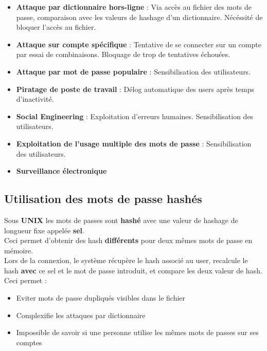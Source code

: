 \documentclass{report}
\begin{document}
		\begin{itemize}
			\item \textbf{Attaque par dictionnaire hors-ligne} : Via accès au fichier des mots de passe, comparaison avec les valeurs de hashage d'un dictionnaire. Nécéssité de bloquer l'accès au fichier.
			\item \textbf{Attaque sur compte spécifique} : Tentative de se connecter sur un compte par essai de combinaisons. Bloquage de trop de tentatives échouées.
			\item \textbf{Attaque par mot de passe populaire} : Sensibilisation des utilisateurs.
			\item \textbf{Piratage de poste de travail} : Délog automatique des users après temps d'inactivité.
			\item \textbf{Social Engineering} : Exploitation d'erreurs humaines. Sensibilisation des utilisateurs.
			\item \textbf{Exploitation de l'usage multiple des mots de passe} : Sensibilisation des utilisateurs.
			\item \textbf{Surveillance électronique}
		\end{itemize}

		\subsection{Utilisation des mots de passe hashés}

			Sous \textbf{UNIX} les mots de passes sont \textbf{hashé} avec une valeur de hashage de longueur fixe appelée \textbf{sel}.\\

			Ceci permet d'obtenir des hash \textbf{différents} pour deux mêmes mots de passe en mémoire.\\

			Lors de la connexion, le système récupère le hash associé au user, recalcule le hash \textbf{avec} ce sel et le mot de passe introduit, et compare les deux valeur de hash.\\

			Ceci permet : \\

			\begin{itemize}
				\item Eviter mots de passe dupliqués visibles dans le fichier
				\item Complexifie les attaques par dictionnaire
				\item Impossible de savoir si une personne utilise les mêmes mots de passes sur ses comptes\\
			\end{itemize}
\end{document}
